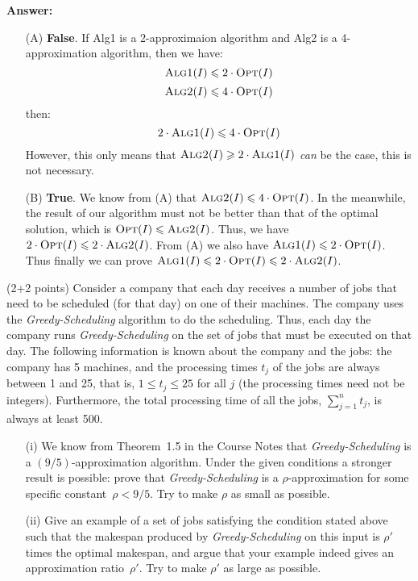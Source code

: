 \documentclass{article}
\renewcommand{\leq}{\leqslant}
\renewcommand{\geq}{\geqslant}
\newcounter{rcounter}
\newenvironment{rlist}%
{\begin{list}{\setnr-\arabic{rcounter}}{\usecounter{rcounter}}}{\end{list}}
\begin{document}
\begin{rlist}
        \textbf{Answer:}
        \begin{enumerate}
            \item[(A)]
            \textbf{False}. If {\sc Alg1} is a 2-approximaion algorithm and {\sc Alg2} is a 4-approximation algorithm, then we have:
            $$\mbox{{\sc Alg1}}(I) \leq 2\cdot \mbox{{\sc Opt}}(I)$$
            $$\mbox{{\sc Alg2}}(I) \leq 4\cdot \mbox{{\sc Opt}}(I)$$
            then:
            $$2\cdot \mbox{{\sc Alg1}}(I) \leq 4\cdot \mbox{{\sc Opt}}(I)$$
            However, this only means that $\mbox{{\sc Alg2}}(I) \geq 2\cdot \mbox{{\sc Alg1}}(I)$ \emph{can} be the case, this is not necessary.
            \item[(B)]
            \textbf{True}. We know from (A) that $\mbox{{\sc Alg2}}(I) \leq 4\cdot \mbox{{\sc Opt}}(I)$. In the meanwhile, the result of our algorithm must not be better than that of the optimal solution, which is $\mbox{{\sc Opt}}(I) \leq \mbox{{\sc Alg2}}(I)$. Thus, we have $2\cdot \mbox{{\sc Opt}}(I) \leq 2\cdot \mbox{{\sc Alg2}}(I)$.
            From (A) we also have $\mbox{{\sc Alg1}}(I) \leq 2\cdot \mbox{{\sc Opt}}(I)$. Thus finally we can prove $\mbox{{\sc Alg1}}(I) \leq 2\cdot \mbox{{\sc Opt}}(I) \leq 2\cdot \mbox{{\sc Alg2}}(I)$.
        \end{enumerate}
        \item (2+2 points)
        Consider a company that each day receives a number of jobs that need to be scheduled (for that day) on one of their machines. The company uses the \emph{Greedy-Scheduling} algorithm to do the scheduling. Thus, each day the company runs \emph{Greedy-Scheduling} on the set of jobs that must be executed on that day. The following information is known about the company and the jobs: the company has 5 machines, and the processing times $t_j$ of the jobs are always between 1 and 25, that is, $1\leq t_j\leq 25$ for all $j$ (the processing times need not be integers). Furthermore, the total processing time of all the jobs, $\sum_{j=1}^n t_j$, is always at least 500.
        \begin{enumerate}
            \item[(i)]
            We know from Theorem~1.5 in the Course Notes that \emph{Greedy-Scheduling} is a $(9/5)$-approximation algorithm. Under the given conditions a stronger result is possible: prove that \emph{Greedy-Scheduling} is a $\rho$-approximation  for some specific constant~$\rho<9/5$. Try to make $\rho$ as small as possible. 
            \item[(ii)]
            Give an example of a set of jobs satisfying the condition stated above such that the makespan produced by \emph{Greedy-Scheduling} on this input is $\rho'$ times the optimal makespan, and argue that your example indeed gives an approximation ratio~$\rho'$. Try to make $\rho'$ as large as possible.
        \end{enumerate}
        

\end{rlist}
\end{document}
